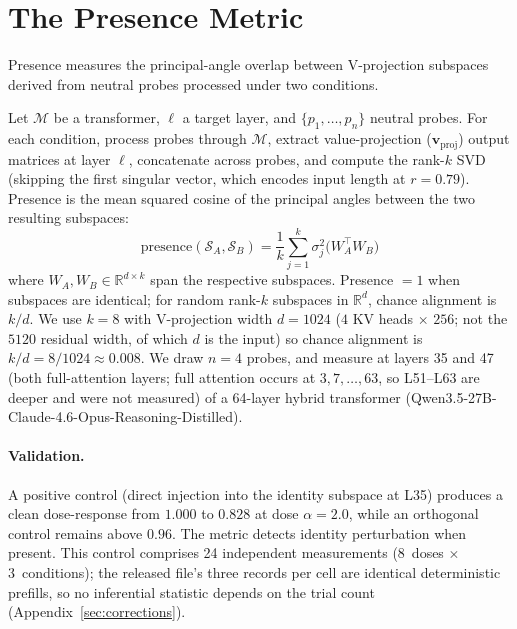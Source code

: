 \documentclass[11pt,a4paper]{article}
\begin{document}
\section{The Presence Metric}
\label{sec:method}

Presence measures the principal-angle overlap between V-projection
subspaces derived from neutral probes processed under two conditions.

Let $\mathcal{M}$ be a transformer, $\ell$ a target layer, and
$\{p_1, \ldots, p_n\}$ neutral probes. For each condition, process probes
through $\mathcal{M}$, extract value-projection ($\mathbf{v}_\text{proj}$) output matrices at
layer $\ell$, concatenate across probes, and compute the rank-$k$ SVD (skipping the
first singular vector, which encodes input length at $r = 0.79$). Presence
is the mean squared cosine of the principal angles between the two
resulting subspaces:
\begin{equation}
\text{presence}(\mathcal{S}_A, \mathcal{S}_B)
  = \frac{1}{k} \sum_{j=1}^{k} \sigma_j^2
    \bigl( W_A^\top W_B \bigr)
\end{equation}
where $W_A, W_B \in \mathbb{R}^{d \times k}$ span the respective
subspaces. Presence $= 1$ when subspaces are identical; for random
rank-$k$ subspaces in $\mathbb{R}^d$, chance alignment is $k/d$. We use
$k = 8$ with V-projection width $d = 1024$ ($4$ KV heads $\times$ $256$;
not the $5120$ residual width, of which $d$ is the input) so chance
alignment is $k/d = 8/1024 \approx 0.008$. We draw $n = 4$ probes, and
measure at layers 35 and 47 (both full-attention layers; full attention
occurs at $3, 7, \ldots, 63$, so L51--L63 are deeper and were not
measured) of a 64-layer hybrid
transformer (Qwen3.5-27B-Claude-4.6-Opus-Reasoning-Distilled).

\paragraph{Validation.} A positive control (direct injection into the
identity subspace at L35) produces a clean dose-response from $1.000$ to
$0.828$ at dose $\alpha = 2.0$, while an orthogonal control remains above
$0.96$. The metric detects identity perturbation when present. This control
comprises 24 independent measurements (8~doses $\times$ 3~conditions); the
released file's three records per cell are identical deterministic
prefills, so no inferential statistic depends on the trial count
(Appendix~\ref{sec:corrections}).
\end{document}
